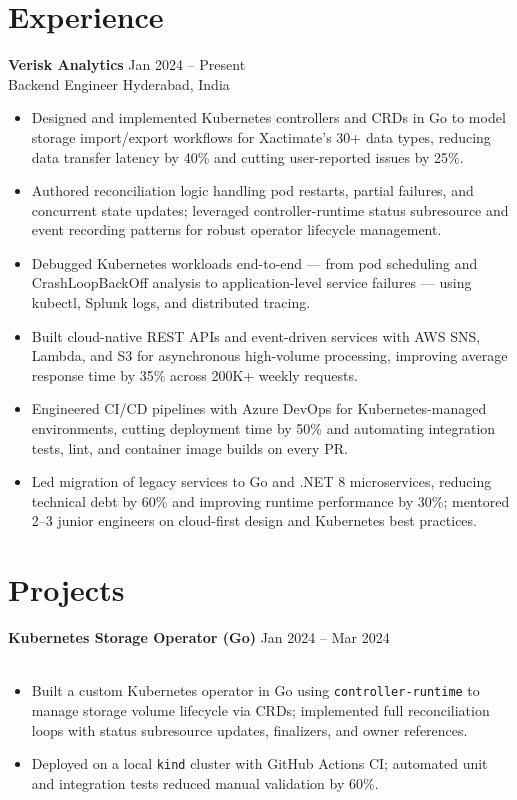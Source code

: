 \documentclass[9pt,letterpaper]{article}
\newcommand{\resumeSubheading}[4]{%
  \textbf{#1} \hfill #2 \\
  #3 \hfill #4 \\
}
\begin{document}
\section*{Experience}
\resumeSubheading{Verisk Analytics}{Jan 2024 -- Present}{Backend Engineer}{Hyderabad, India}
\begin{itemize}
    \item Designed and implemented Kubernetes controllers and CRDs in Go to model storage import/export workflows for Xactimate's 30+ data types, reducing data transfer latency by 40\% and cutting user-reported issues by 25\%.
    \item Authored reconciliation logic handling pod restarts, partial failures, and concurrent state updates; leveraged controller-runtime status subresource and event recording patterns for robust operator lifecycle management.
    \item Debugged Kubernetes workloads end-to-end — from pod scheduling and CrashLoopBackOff analysis to application-level service failures — using kubectl, Splunk logs, and distributed tracing.
    \item Built cloud-native REST APIs and event-driven services with AWS SNS, Lambda, and S3 for asynchronous high-volume processing, improving average response time by 35\% across 200K+ weekly requests.
    \item Engineered CI/CD pipelines with Azure DevOps for Kubernetes-managed environments, cutting deployment time by 50\% and automating integration tests, lint, and container image builds on every PR.
    \item Led migration of legacy services to Go and .NET 8 microservices, reducing technical debt by 60\% and improving runtime performance by 30\%; mentored 2--3 junior engineers on cloud-first design and Kubernetes best practices.
\end{itemize}

\section*{Projects}
\resumeSubheading{Kubernetes Storage Operator (Go)}{Jan 2024 -- Mar 2024}{}{}
\begin{itemize}
    \item Built a custom Kubernetes operator in Go using \texttt{controller-runtime} to manage storage volume lifecycle via CRDs; implemented full reconciliation loops with status subresource updates, finalizers, and owner references.
    \item Deployed on a local \texttt{kind} cluster with GitHub Actions CI; automated unit and integration tests reduced manual validation by 60\%.
\end{itemize}
\end{document}
